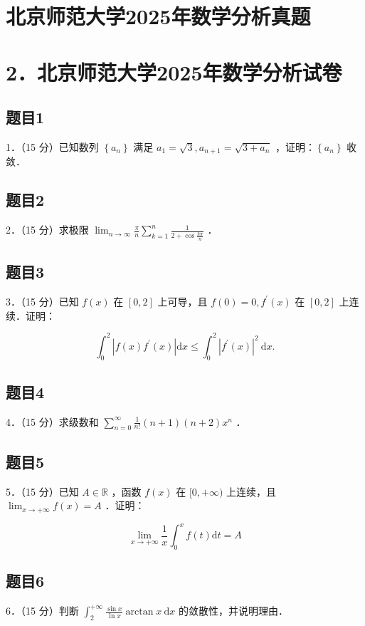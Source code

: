 \documentclass{article}
\begin{document}
\section*{北京师范大学2025年数学分析真题}
\section*{2．北京师范大学2025年数学分析试卷}

\subsection{题目1}
1．（15 分）已知数列 \(\left\{a_{n}\right\}\) 满足 \(a_{1}=\sqrt{3}, a_{n+1}=\sqrt{3+a_{n}}\) ，证明：\(\left\{a_{n}\right\}\) 收敛．

\subsection{题目2}
2．（15 分）求极限 \(\lim _{n \rightarrow \infty} \frac{\pi}{n} \sum_{k=1}^{n} \frac{1}{2+\cos \frac{k \pi}{n}}\) ．

\subsection{题目3}
3．（15 分）已知 \(f(x)\) 在 \([0,2]\) 上可导，且 \(f(0)=0, f^{\prime}(x)\) 在 \([0,2]\) 上连续．证明：

\[
\int_{0}^{2}\left|f(x) f^{\prime}(x)\right| \mathrm{d} x \leq \int_{0}^{2}\left|f^{\prime}(x)\right|^{2} \mathrm{~d} x .
\]

\subsection{题目4}
4．（15 分）求级数和 \(\sum_{n=0}^{\infty} \frac{1}{n!}(n+1)(n+2) x^{n}\) ．

\subsection{题目5}
5．（15 分）已知 \(A \in \mathbb{R}\) ，函数 \(f(x)\) 在 \([0,+\infty)\) 上连续，且 \(\lim _{x \rightarrow+\infty} f(x)=A\) ．证明：

\[
\lim _{x \rightarrow+\infty} \frac{1}{x} \int_{0}^{x} f(t) \mathrm{d} t=A
\]

\subsection{题目6}
6．（15 分）判断 \(\int_{2}^{+\infty} \frac{\sin x}{\ln x} \arctan x \mathrm{~d} x\) 的敛散性，并说明理由．
\end{document}
